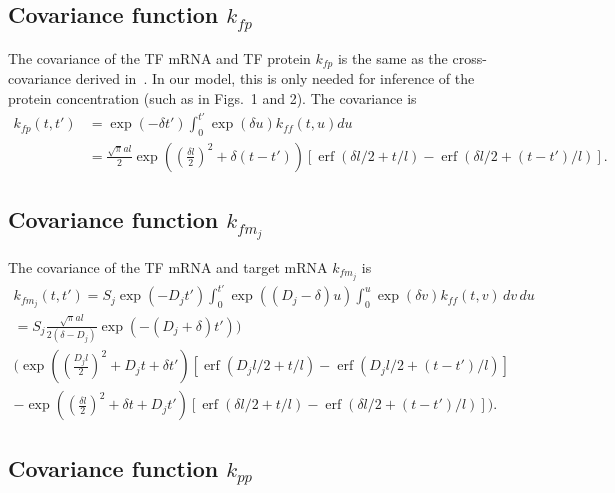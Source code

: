\documentclass{article}
\newcommand{\erf}{\operatorname{erf}}
\begin{document}
\subsection{Covariance function $k_{fp}$}

The covariance of the TF mRNA and TF protein $k_{fp}$ is the same
as the cross-covariance derived
in~\cite{Lawrence2007}.  In our model, this is only needed for
inference of the protein concentration (such as in Figs.~1 and 2).
The covariance is
\begin{equation}
  \begin{split}
    k_{fp}(t, t') &= \exp(-\delta t') \int_0^{t'} \exp(\delta u) k_{ff}(t, u) du \\
    &= \frac{\sqrt{\pi}al}{2} \exp\left(\left(\frac{\delta l}{2}\right)^2 + \delta (t - t') \right)
    [\erf(\delta l / 2 + t/l) - \erf(\delta l / 2 + (t-t')/l)].
  \end{split}
\end{equation}

\subsection{Covariance function $k_{fm_j}$}

The covariance of the TF mRNA and target mRNA $k_{fm_j}$ is
\begin{multline}
  k_{f m_j}(t, t') = S_j \exp(-D_j t') \int_0^{t'}
  \exp((D_j - \delta) u) \int_0^u \exp(\delta v) k_{ff}(t, v)\, dv\, du \\
  = S_j \frac{\sqrt{\pi} al}{2(\delta - D_j)} \exp(-(D_j+\delta) t')) \\
  \bigg(
  \exp\left(\left(\frac{D_j l}{2}\right)^2 + D_j t + \delta t' \right)
  [\erf(D_j l / 2 + t/l) - \erf(D_j l / 2 + (t-t')/l)] \\
  -
  \exp\left(\left(\frac{\delta l}{2}\right)^2 + \delta t + D_j t'\right)
  [\erf(\delta l / 2 + t/l) - \erf(\delta l / 2 + (t-t')/l)]
  \bigg).
\end{multline}

\subsection{Covariance function $k_{pp}$}
\end{document}
